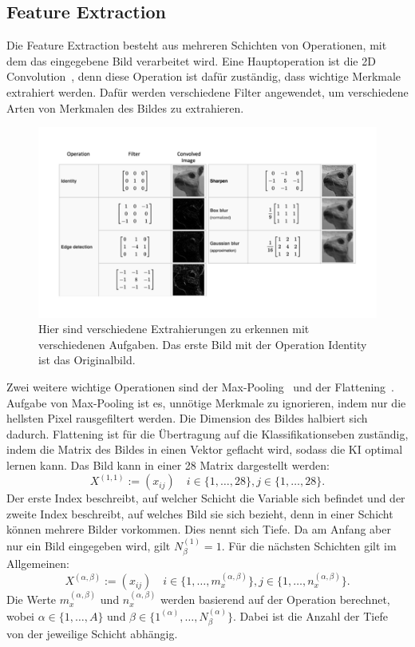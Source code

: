 \documentclass[11pt]{article}
\begin{document}
\subsection{Feature Extraction}\label{feature}
Die Feature Extraction besteht aus mehreren Schichten von Operationen, mit dem das eingegebene Bild verarbeitet wird.
Eine Hauptoperation ist die 2D Convolution~\cite{15}, denn diese Operation ist dafür zuständig, dass wichtige Merkmale extrahiert werden.
Dafür werden verschiedene Filter angewendet, um verschiedene Arten von Merkmalen des Bildes zu extrahieren.
\begin{figure}[h]
    \centering
    \includegraphics[width=400pt, keepaspectratio]{images/filter}
    \caption[Verschiedene Extraktionsmöglichkeiten~\cite{12}]{Hier sind verschiedene Extrahierungen zu erkennen mit verschiedenen Aufgaben. Das erste Bild mit der Operation Identity ist das Originalbild.~\cite{12}}\label{kernel}
\end{figure}
Zwei weitere wichtige Operationen sind der Max-Pooling~\cite{17} und der Flattening~\cite{18}. Aufgabe von Max-Pooling ist es, unnötige Merkmale
zu ignorieren, indem nur die hellsten Pixel rausgefiltert werden. Die Dimension des Bildes halbiert sich dadurch. Flattening ist für die Übertragung auf die Klassifikationseben zuständig,
indem die Matrix des Bildes in einen Vektor geflacht wird, sodass die KI optimal lernen kann.
Das Bild kann in einer 28 Matrix dargestellt werden:
\begin{equation}
    X^{(1,1)} := (x_{ij}) \quad i \in \{1,\ldots,28\}, j \in \{1,\ldots,28\}.
\end{equation}
Der erste Index beschreibt, auf welcher Schicht die Variable sich befindet und der zweite Index beschreibt, auf welches
Bild sie sich bezieht, denn in einer Schicht können mehrere Bilder vorkommen. Dies nennt sich Tiefe. Da am Anfang aber nur ein Bild eingegeben wird, gilt
$N_{\beta}^{(1)} = 1$. Für die nächsten Schichten gilt im Allgemeinen:
\begin{equation}\label{newlayer}
    X^{(\alpha,\beta)} := (x_{ij}) \quad i \in \{1,\ldots,m_{x}^{(\alpha,\beta)}\}, j \in \{1,\ldots,n_{x}^{(\alpha,\beta)}\}.
\end{equation}
Die Werte $m_{x}^{(\alpha,\beta)}$ und $n_{x}^{(\alpha,\beta)}$ werden basierend auf der Operation berechnet, wobei
$\alpha \in \{1,\ldots,A\}$ und $\beta \in \{1^{(\alpha)},\ldots,N_{\beta}^{(\alpha)}\}$. Dabei ist die Anzahl der Tiefe von der jeweilige Schicht abhängig.
\end{document}
